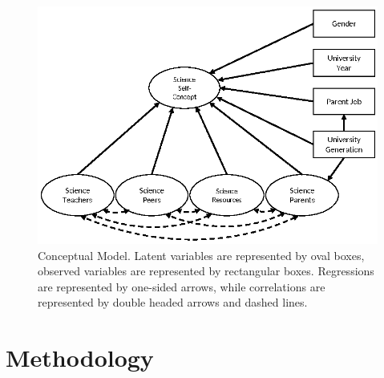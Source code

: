\begin{figure}
 \includegraphics{ConceptualModel.eps}
\caption{Conceptual Model. Latent variables are represented by oval boxes, observed variables are represented by rectangular boxes. Regressions are represented by one-sided arrows, while correlations are represented by double headed arrows and dashed lines. }
\label{fig:1}       
\end{figure}

\section*{Methodology}
\label{method}
